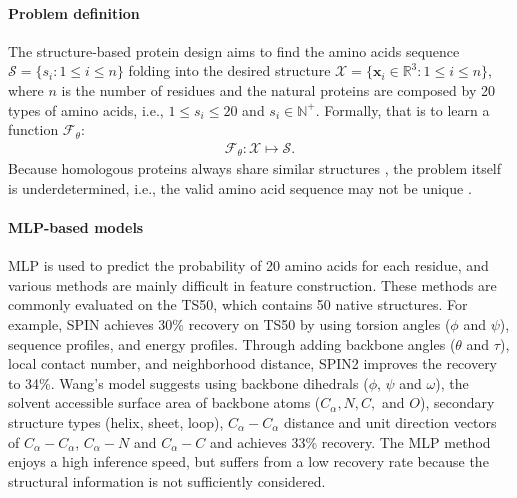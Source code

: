 \documentclass{article}
\begin{document}
\vspace{-2mm}
\paragraph{Problem definition} The structure-based protein design aims to find the amino acids sequence $\mathcal{S} = \{s_i: 1 \leq i \leq n\}$ folding into the desired structure $\mathcal{X}=\{\boldsymbol{x}_{i} \in \mathbb{R}^3: 1 \leq i \leq n \}$, where $n$ is the number of residues and the natural proteins are composed by 20 types of amino acids, i.e., $1\leq s_i \leq 20$ and $s_i \in \mathbb{N}^+$. Formally, that is to learn a function $\mathcal{F}_{\theta}$:
\begin{align}
    \label{eq:protein_dedign}
    \mathcal{F}_{\theta}: \mathcal{X} \mapsto \mathcal{S}.
\end{align}
Because homologous proteins always share similar structures \citep{pearson2005limits}, the problem itself is underdetermined, i.e., the valid amino acid sequence may not be unique \citep{gao2020deep}. 




\vspace{-2mm}
\paragraph{MLP-based models} 
MLP is used to predict the probability of 20 amino acids for each residue, and various methods are mainly difficult in feature construction. These methods are commonly evaluated on the TS50, which contains 50 native structures. For example, SPIN \citep{li2014direct} achieves 30\% recovery on TS50 by using torsion angles ($\phi$ and $\psi$), sequence profiles, and energy profiles. Through adding backbone angles ($\theta$ and $\tau$), local contact number, and neighborhood distance, SPIN2 \citep{o2018spin2} improves the recovery to 34\%. Wang's model \citep{wang2018computational} suggests using backbone dihedrals ($\phi$, $\psi$ and $\omega$), the solvent accessible surface area of backbone atoms ($C_{\alpha}, N, C,$ and $O$), secondary structure types (helix, sheet, loop), $C_{\alpha}-C_{\alpha}$ distance and unit direction vectors of $C_{\alpha}-C_{\alpha}$, $C_{\alpha}-N$ and $C_{\alpha}-C$ and achieves 33\% recovery. The MLP method enjoys a high inference speed, but suffers from a low recovery rate because the structural information is not sufficiently considered.

\vspace{-2mm}
\end{document}
